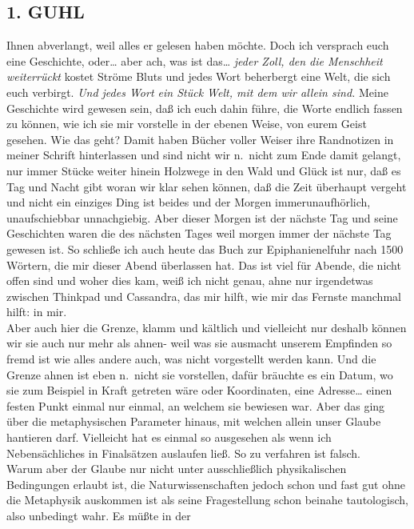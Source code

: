 \documentclass[
]{article}
\author{}
\date{\vspace{-2.5em}}
\begin{document}
\subsection{1. GUHL}\label{guhl}

Ihnen abverlangt, weil alles er gelesen haben möchte. Doch ich versprach
euch eine Geschichte, oder\ldots{} aber ach, was ist das\ldots{}
\emph{jeder Zoll, den die Menschheit weiterrückt }kostet Ströme Bluts
und jedes Wort beherbergt eine Welt, die sich euch verbirgt. \emph{Und
jedes Wort ein Stück Welt, mit dem wir allein sind. }Meine Geschichte
wird gewesen sein, daß ich euch dahin führe, die Worte endlich fassen zu
können, wie ich sie mir vorstelle in der ebenen Weise, von eurem Geist
gesehen. Wie das geht? Damit haben Bücher voller Weiser ihre Randnotizen
in meiner Schrift hinterlassen und sind nicht wir n.~nicht zum Ende
damit gelangt, nur immer Stücke weiter hinein Holzwege in den Wald und
Glück ist nur, daß es Tag und Nacht gibt woran wir klar sehen können,
daß die Zeit überhaupt vergeht und nicht ein einziges Ding ist beides
und der Morgen immerunaufhörlich, unaufschiebbar unnachgiebig. Aber
dieser Morgen ist der nächste Tag und seine Geschichten waren die des
nächsten Tages weil morgen immer der nächste Tag gewesen ist. So
schließe ich auch heute das Buch zur Epiphanienelfuhr nach 1500 Wörtern,
die mir dieser Abend überlassen hat. Das ist viel für Abende, die nicht
offen sind und woher dies kam, weiß ich nicht genau, ahne nur
irgendetwas zwischen Thinkpad und Cassandra, das mir hilft, wie mir das
Fernste manchmal hilft: in mir.\\
Aber auch hier die Grenze, klamm und kältlich und vielleicht nur deshalb
können wir sie auch nur mehr als ahnen- weil was sie ausmacht unserem
Empfinden so fremd ist wie alles andere auch, was nicht vorgestellt
werden kann. Und die Grenze ahnen ist eben n.~nicht sie vorstellen,
dafür bräuchte es ein Datum, wo sie zum Beispiel in Kraft getreten wäre
oder Koordinaten, eine Adresse\ldots{} einen festen Punkt einmal nur
einmal, an welchem sie bewiesen war. Aber das ging über die
metaphysischen Parameter hinaus, mit welchen allein unser Glaube
hantieren darf. Vielleicht hat es einmal so ausgesehen als wenn ich
Nebensächliches in Finalsätzen auslaufen ließ. So zu verfahren ist
falsch.\\
Warum aber der Glaube nur nicht unter ausschließlich physikalischen
Bedingungen erlaubt ist, die Naturwissenschaften jedoch schon und fast
gut ohne die Metaphysik auskommen ist als seine Fragestellung schon
beinahe tautologisch, also unbedingt wahr. Es müßte in der
\end{document}
